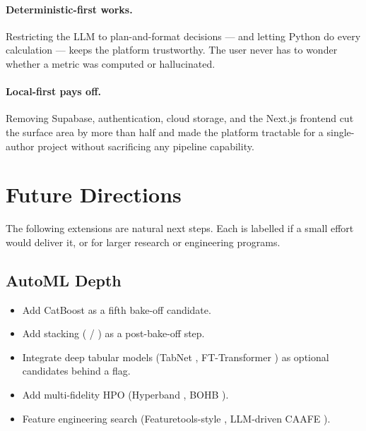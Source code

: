 \paragraph{Deterministic-first works.}
Restricting the LLM to plan-and-format decisions --- and letting
Python do every calculation --- keeps the platform trustworthy. The
user never has to wonder whether a metric was computed or
hallucinated.

\paragraph{Local-first pays off.}
Removing Supabase, authentication, cloud storage, and the Next.js
frontend cut the surface area by more than half and made the
platform tractable for a single-author project without sacrificing
any pipeline capability.

\section{Future Directions}
\label{sec:future}

The following extensions are natural next steps. Each is labelled
\propd{} if a small effort would deliver it, or \future{} for
larger research or engineering programs.

\subsection{AutoML Depth}
\label{sec:future-automl}

\begin{itemize}[leftmargin=1.4em]
  \item \propd{} Add CatBoost \citep{prokhorenkova2018catboost} as a
        fifth bake-off candidate.
  \item \propd{} Add stacking ( /
         \citep{sklearn2011}) as a
        post-bake-off step.
  \item \future{} Integrate deep tabular models (TabNet
        \citep{arik2021tabnet}, FT-Transformer
        \citep{gorishniy2021revisiting}) as optional candidates
        behind a flag.
  \item \future{} Add multi-fidelity HPO (Hyperband
        \citep{li2017hyperband}, BOHB \citep{falkner2018bohb}).
  \item \future{} Feature engineering search
        (Featuretools-style \citep{kanter2015dsm}, LLM-driven CAAFE
        \citep{hollmann2024caafe}).
\end{itemize}

